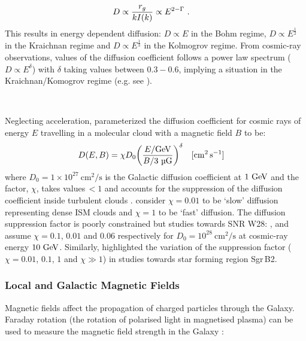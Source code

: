 \begin{equation}
    \begin{aligned}
        D&\propto \frac{r_g}{kI\qty(k)}\propto E^{2-\Gamma} \text{ .}
    \end{aligned}
\end{equation}
This results in energy dependent diffusion: $D\propto E$ in the Bohm regime, $D\propto E^{\frac{1}{2}}$ in the Kraichnan regime and $D\propto E^{\frac{1}{3}}$ in the Kolmogrov regime. From cosmic-ray observations, values of the diffusion coefficient follows a power law spectrum ($D\propto E^{\delta}$) with $\delta$ taking values between $0.3-0.6$, implying a situation in the Kraichnan/Komogrov regime (e.g. see \cite{2007ARNPS..57..285S}).
\par~\par 
Neglecting acceleration, \cite{2007Ap&SS.309..365G} parameterized the diffusion coefficient for cosmic rays of energy $E$ travelling in a molecular cloud with a magnetic field $B$ to be:
\begin{align}
    D\qty(E,B)&=\chi D_0\qty(\frac{E/\GeV}{B/3~\si{\micro G}})^\delta\quad [\si{\centi\meter\squared\per\second}] \label{eq:diffusion}
\end{align}
where $D_0=1\times 10^{27}~\si{\centi\meter\squared\per\second}$ is the Galactic diffusion coefficient at $1~\GeV$ and the factor, $\chi$, takes values\,$<1$ and accounts for the suppression of the diffusion coefficient inside turbulent clouds \citep{1990acr..book.....B}. \cite{1996A&A...309..917A} consider $\chi=0.01$ to be `slow' diffusion representing dense ISM clouds \citep{1988ApJ...334..722O} and $\chi=1$ to be `fast' diffusion. The diffusion suppression factor is poorly constrained but studies towards SNR W28: \citep{2010MNRAS.409L..35L}, \citep{2010A&A...516L..11G} and \cite{2010sf2a.conf..313G} assume $\chi=0.1$, $0.01$ and $0.06$ respectively for $D_0=10^{28}~\si{\centi\meter\squared\per\second}$ at cosmic-ray energy $10~\GeV$. Similarly, \cite{2008MNRAS.390..683P} highlighted the variation of the suppression factor ($\chi=0.01$, $0.1$, $1$ and $\chi \gg 1$) in studies towards star forming region Sgr\,B2.

\subsubsection{Local and Galactic Magnetic Fields}

Magnetic fields affect the propagation of charged particles through the Galaxy. Faraday rotation (the rotation of polarised light in magnetised plasma) can be used to measure the magnetic field strength in the Galaxy \citep{1846RSPT..136....1F}:

